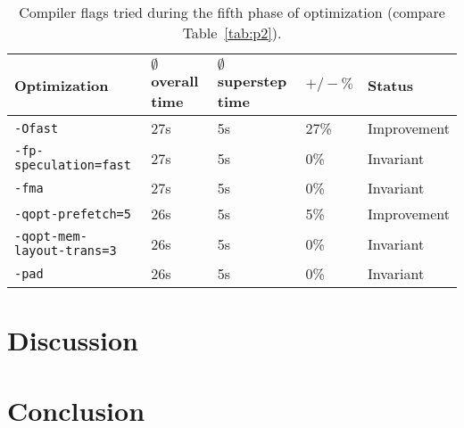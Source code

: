 \documentclass[twoside,11pt]{article}
\begin{document}
\begin{table}
  \begin{tabu}{|X|l|l|l|l|}
    \hline
    Optimization &$\emptyset$ overall time
                 &$\emptyset$ superstep time  &$+/-\%$ &Status \\
    \hline
    \texttt{-Ofast} &27s &5s &27\% &Improvement \\
    \hline
    \texttt{-fp-speculation=fast} &27s &5s &0\% &Invariant \\
    \hline
    \texttt{-fma} &27s &5s &0\% &Invariant \\
    \hline
    \texttt{-qopt-prefetch=5} &26s &5s &5\% &Improvement \\
    \hline
    \texttt{-qopt-mem-layout-trans=3} &26s &5s &0\% &Invariant \\
    \hline
    \texttt{-pad} &26s &5s &0\% &Invariant \\
    \hline
  \end{tabu}
  \caption{Compiler flags tried during the fifth phase of
    optimization (compare Table~\ref{tab:p2}).}
  \label{tab:p5}
\end{table}



\section{Discussion} %
\label{sec:dis}










\section{Conclusion} %
\label{sec:con}



\end{document}
